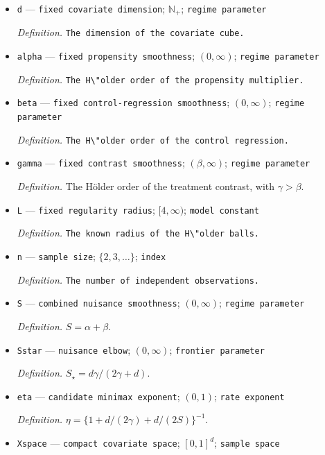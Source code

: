 \documentclass{article}
\begin{document}
\begin{itemize}
  \item \texttt{d} --- \texttt{fixed covariate dimension}; \(\mathbb N_{+}\); \texttt{regime parameter}
  \par\smallskip\noindent\emph{Definition.} \texttt{The dimension of the covariate cube.}
  \item \texttt{alpha} --- \texttt{fixed propensity smoothness}; \((0,\infty)\); \texttt{regime parameter}
  \par\smallskip\noindent\emph{Definition.} \texttt{The H\textbackslash{}\allowbreak{}"older order of the propensity multiplier.}
  \item \texttt{beta} --- \texttt{fixed control-\allowbreak{}regression smoothness}; \((0,\infty)\); \texttt{regime parameter}
  \par\smallskip\noindent\emph{Definition.} \texttt{The H\textbackslash{}\allowbreak{}"older order of the control regression.}
  \item \texttt{gamma} --- \texttt{fixed contrast smoothness}; \((\beta,\infty)\); \texttt{regime parameter}
  \par\smallskip\noindent\emph{Definition.} The H\"older order of the treatment contrast, with \(\gamma>\beta\).
  \item \texttt{L} --- \texttt{fixed regularity radius}; \([4,\infty)\); \texttt{model constant}
  \par\smallskip\noindent\emph{Definition.} \texttt{The known radius of the H\textbackslash{}\allowbreak{}"older balls.}
  \item \texttt{n} --- \texttt{sample size}; \(\{2,3,\ldots\}\); \texttt{index}
  \par\smallskip\noindent\emph{Definition.} \texttt{The number of independent observations.}
  \item \texttt{S} --- \texttt{combined nuisance smoothness}; \((0,\infty)\); \texttt{regime parameter}
  \par\smallskip\noindent\emph{Definition.} \(S=\alpha+\beta\).
  \item \texttt{Sstar} --- \texttt{nuisance elbow}; \((0,\infty)\); \texttt{frontier parameter}
  \par\smallskip\noindent\emph{Definition.} \(S_{\star}=d\gamma/(2\gamma+d)\).
  \item \texttt{eta} --- \texttt{candidate minimax exponent}; \((0,1)\); \texttt{rate exponent}
  \par\smallskip\noindent\emph{Definition.} \(\eta=\{1+d/(2\gamma)+d/(2S)\}^{-1}\).
  \item \texttt{Xspace} --- \texttt{compact covariate space}; \([0,1]^d\); \texttt{sample space}

\end{itemize}
\end{document}
